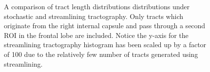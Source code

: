 \begin{figure}
  \caption{A comparison of tract length distributions distributions under stochastic and streamlining tractography.  Only tracts which originate from the right internal capsule and pass through a second ROI in the frontal lobe are included.  Notice the y-axis for the streamlining tractography histogram has been scaled up by a factor of 100 due to the relatively few number of tracts generated using streamlining.}
    \label{fig:streamlinecomphistLength}
\end{figure}


